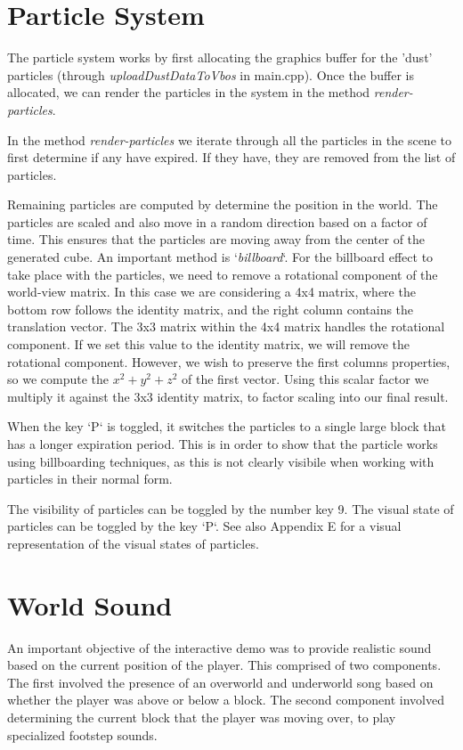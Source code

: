 \documentclass{book}
\begin{document}
\section{Particle System}
    
The particle system works by first allocating the graphics buffer for the 'dust' particles (through \textit{uploadDustDataToVbos} in main.cpp).  Once the buffer is allocated, we can render the particles in the system in the method \textit{render-particles}.
    
In the method \textit{render-particles} we iterate through all the particles in the scene to first determine if any have expired.  If they have, they are removed from the list of particles.
    
Remaining particles are computed by determine the position in the world.  The particles are scaled and also move in a random direction based on a factor of time.  This ensures that the particles are moving away from the center of the generated cube.  An important method is `\textit{billboard}`.  For the billboard effect to take place with the particles, we need to remove a rotational component of the world-view matrix.  In this case we are considering a 4x4 matrix, where the bottom row follows the identity matrix, and the right column contains the translation vector.  The 3x3 matrix within the 4x4 matrix handles the rotational component.  If we set this value to the identity matrix, we will remove the rotational component.  However, we wish to preserve the first columns properties, so we compute the $x^2 + y^2 + z^2$ of the first vector.  Using this scalar factor we multiply it against the 3x3 identity matrix, to factor scaling into our final result.
    
When the key `P` is toggled, it switches the particles to a single large block that has a longer expiration period.  This is in order to show that the particle works using billboarding techniques, as this is not clearly visibile when working with particles in their normal form.
    
The visibility of particles can be toggled by the number key 9.  The visual state of particles can be toggled by the key `P`.  See also Appendix E for a visual representation of the visual states of particles.
    
\section{World Sound}
    
An important objective of the interactive demo was to provide realistic sound based on the current position of the player.  This comprised of two components.  The first involved the presence of an overworld and underworld song based on whether the player was above or below a block.   The second component involved determining the current block that the player was moving over, to play specialized footstep sounds.
    
\end{document}
